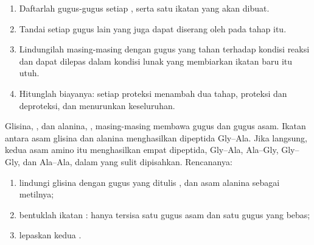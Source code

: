 \begin{method}\label{met:g12:synthesis-strategy:plan}
\begin{enumerate}
  \item Daftarlah gugus-gugus setiap , serta satu ikatan yang
        akan dibuat.
  \item Tandai setiap gugus lain yang juga dapat diserang oleh 
        pada tahap itu.
  \item Lindungilah masing-masing dengan gugus yang tahan terhadap
        kondisi reaksi dan dapat dilepas dalam kondisi lunak yang
        membiarkan ikatan baru itu utuh.
  \item Hitunglah biayanya: setiap proteksi menambah dua tahap, proteksi
        dan deproteksi, dan menurunkan  keseluruhan.
\end{enumerate}
\end{method}

\begin{example}\label{ex:g12:synthesis-strategy:dipeptide}
Glisina, , dan alanina, ,
masing-masing membawa gugus  dan gugus asam. Ikatan  antara
asam glisina dan  alanina menghasilkan dipeptida Gly--Ala. Jika
 langsung, kedua asam amino itu menghasilkan empat dipeptida,
Gly--Ala, Ala--Gly, Gly--Gly, dan Ala--Ala, dalam  yang sulit
dipisahkan. Rencananya:
\begin{enumerate}
  \item lindungi  glisina dengan gugus yang ditulis , dan
        asam alanina sebagai  metilnya;
  \item bentuklah ikatan : hanya tersisa satu gugus asam dan satu
        gugus  yang bebas;
  \item lepaskan kedua .
\end{enumerate}
\end{example}

